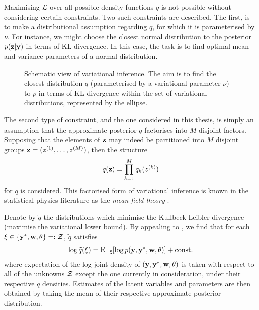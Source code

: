 Maximising ${\mathcal L}$ over all possible density functions $q$ is not possible without considering certain constraints.
Two such constraints are described. 
The first, is to make a distributional assumption regarding $q$, for which it is parameterised by $\nu$.
For instance, we might choose the closest normal distribution to the posterior $p({\mathbf z}|{\mathbf y})$ in terms of KL divergence.
In this case, the task is to find optimal mean and variance parameters of a normal distribution.

\begin{figure}[htb]
  \centering
  \caption{Schematic view of variational inference. The aim is to find the closest distribution $q$ (parameterised by a variational parameter $\nu$) to $p$ in terms of KL divergence within the set of variational distributions, represented by the ellipse.}
\end{figure}

The second type of constraint, and the one considered in this thesis, is simply an assumption that the approximate posterior $q$ factorises into $M$ disjoint factors.
Supposing that the elements of ${\mathbf z}$ may indeed be partitioned into $M$ disjoint groups ${\mathbf z} = (z^{(1)},\dots,z^{(M)})$, then the structure
\[
  q({\mathbf z}) = \prod_{k=1}^M q_k(z^{(k)})
\]
for $q$ is considered.
This factorised form of variational inference is known in the statistical physics literature as the \emph{mean-field theory} \citep{itzykson1991statistical}.

Denote by $\tilde q$ the distributions which minimise the Kullbeck-Leibler divergence (maximise the variational lower bound).
By appealing to \citet[equation 10.9, p. 466]{bishop2006pattern}, we find that for each $\xi \in \{ {\mathbf y}^*,{\mathbf w},\theta \} =: {\mathcal Z}$, $\tilde q$ satisfies
\begin{align}\label{eq:qtilde}
  \log \tilde q(\xi) = \operatorname{E}_{-\xi} [\log p({\mathbf y}, {\mathbf y}^*, {\mathbf w}, \theta)] + \text{const.}\hspace{0.01em}
\end{align}
where expectation of the log joint density of $({\mathbf y}, {\mathbf y}^*, {\mathbf w}, \theta)$ is taken with respect to all of the unknowns ${\mathcal Z}$ except the one currently in consideration, under their respective $q$ densities. 
Estimates of the latent variables and parameters are then obtained by taking the mean of their respective approximate posterior distribution.


